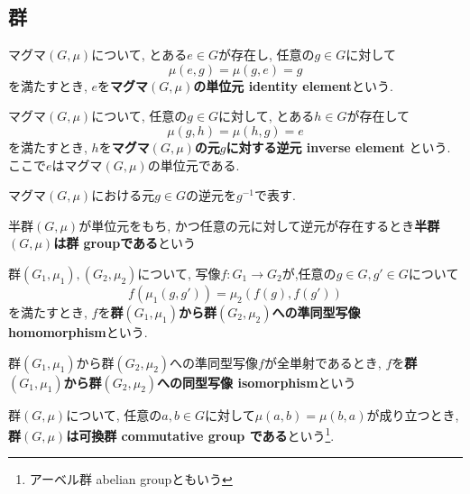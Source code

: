 \subsection{群}
\begin{Def}
マグマ$(G,\mu)$について, とある$e\in G$が存在し, 任意の$g\in G$に対して\[\mu(e,g)=\mu(g,e)=g\]を満たすとき, $e$を{\bf マグマ$(G,\mu)$の単位元 identity element}という.
\end{Def}
\begin{Def}
マグマ$(G,\mu)$について, 任意の$g\in G$に対して, とある$h\in G$が存在して \[\mu(g,h)=\mu(h,g)=e\]を満たすとき, $h$を{\bf マグマ$(G,\mu)$の元$g$に対する逆元 inverse element }という.
ここで$e$はマグマ$(G,\mu)$の単位元である.
\end{Def}
\begin{Notation}
マグマ$(G,\mu)$における元$g\in G$の逆元を$g^{-1}$で表す.
\end{Notation}
\begin{Def}
半群$(G,\mu)$が単位元をもち, かつ任意の元に対して逆元が存在するとき{\bf 半群$(G,\mu)$は群 groupである}という
\end{Def}
\begin{Def}
群$(G_1,\mu_1),(G_2,\mu_2)$について, 写像$f:G_1\rightarrow G_2$が,任意の$g\in G, g'\in G$について \[f(\mu_1(g,g')) = \mu_2(f(g),f(g'))\] を満たすとき, $f$を{\bf 群$(G_1,\mu_1)$から群$(G_2,\mu_2)$への準同型写像 homomorphism}という.
\end{Def}
\begin{Def}
群$(G_1,\mu_1)$から群$(G_2,\mu_2)$への準同型写像$f$が全単射であるとき,
$f$を{\bf 群$(G_1,\mu_1)$から群$(G_2,\mu_2)$への同型写像 isomorphism}という
\end{Def}
\begin{Def}
群$(G,\mu)$について,
任意の$a,b\in G$に対して$\mu(a,b)=\mu(b,a)$が成り立つとき,
{\bf 群$(G,\mu)$は可換群 commutative group である}という\footnote{アーベル群 abelian groupともいう}.
\end{Def}
\begin{comment}
\begin{Def}
位相空間$X$と自然数$n$に対して次の手続きで決定されるアーベル群$H_n(X)$を{\bf$n$次 ホモロジー群}と呼ぶ

...

\end{Def}
\end{comment}

